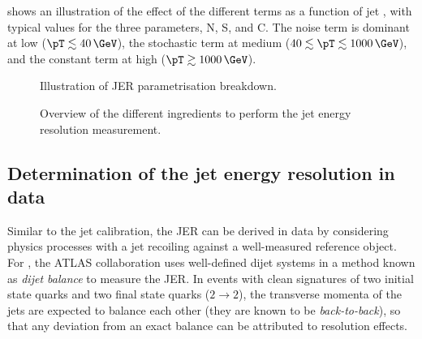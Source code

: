  shows an illustration of the effect of the different terms as a function of jet \pT, with typical values for the three parameters, N, S, and C. The noise term is dominant at low \pT ($\pT \lesssim 40\,\GeV$), the stochastic term at medium \pT ($40 \lesssim \pT \lesssim 1000\,\GeV$), and the constant term at high \pT ($\pT \gtrsim 1000\,\GeV$).



\FloatBarrier
\begin{figure}[t]
    \caption{Illustration of JER parametrisation breakdown.}
    \label{fig:jer-parametrisation}
\end{figure}

\FloatBarrier
\begin{figure}[t]
    \caption{Overview of the different ingredients to perform the jet energy resolution measurement.}
    \label{fig:flow-chart-jer}
\end{figure}


\subsection{Determination of the jet energy resolution in data}
Similar to the \insitu jet calibration, the JER can be derived in data by considering physics processes with a jet recoiling against a well-measured reference object. For \RunTwo, the ATLAS collaboration uses well-defined dijet systems in a method known as \emph{dijet balance} to measure the JER. 
In events with clean signatures of two initial state quarks and two final state quarks ($2 \rightarrow 2$), the transverse momenta of the jets are expected to balance each other (they are known to be \emph{back-to-back}), so that any deviation from an exact balance can be attributed to resolution effects.

